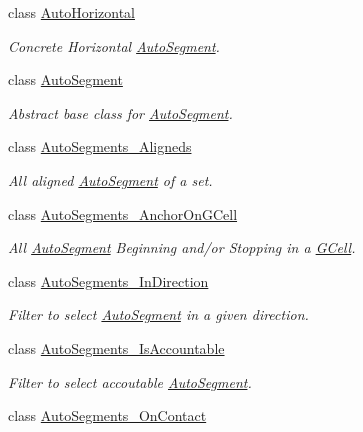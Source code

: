 \begin{DoxyCompactItemize}
class \mbox{\hyperlink{classKatabatic_1_1AutoHorizontal}{Auto\+Horizontal}}
\begin{DoxyCompactList}\small\item\em Concrete Horizontal \mbox{\hyperlink{classKatabatic_1_1AutoSegment}{Auto\+Segment}}. \end{DoxyCompactList}\item 
class \mbox{\hyperlink{classKatabatic_1_1AutoSegment}{Auto\+Segment}}
\begin{DoxyCompactList}\small\item\em Abstract base class for \mbox{\hyperlink{classKatabatic_1_1AutoSegment}{Auto\+Segment}}. \end{DoxyCompactList}\item 
class \mbox{\hyperlink{classKatabatic_1_1AutoSegments__Aligneds}{Auto\+Segments\+\_\+\+Aligneds}}
\begin{DoxyCompactList}\small\item\em All aligned \mbox{\hyperlink{classKatabatic_1_1AutoSegment}{Auto\+Segment}} of a set. \end{DoxyCompactList}\item 
class \mbox{\hyperlink{classKatabatic_1_1AutoSegments__AnchorOnGCell}{Auto\+Segments\+\_\+\+Anchor\+On\+G\+Cell}}
\begin{DoxyCompactList}\small\item\em All \mbox{\hyperlink{classKatabatic_1_1AutoSegment}{Auto\+Segment}} Beginning and/or Stopping in a \mbox{\hyperlink{classKatabatic_1_1GCell}{G\+Cell}}. \end{DoxyCompactList}\item 
class \mbox{\hyperlink{classKatabatic_1_1AutoSegments__InDirection}{Auto\+Segments\+\_\+\+In\+Direction}}
\begin{DoxyCompactList}\small\item\em Filter to select \mbox{\hyperlink{classKatabatic_1_1AutoSegment}{Auto\+Segment}} in a given direction. \end{DoxyCompactList}\item 
class \mbox{\hyperlink{classKatabatic_1_1AutoSegments__IsAccountable}{Auto\+Segments\+\_\+\+Is\+Accountable}}
\begin{DoxyCompactList}\small\item\em Filter to select accoutable \mbox{\hyperlink{classKatabatic_1_1AutoSegment}{Auto\+Segment}}. \end{DoxyCompactList}\item 
class \mbox{\hyperlink{classKatabatic_1_1AutoSegments__OnContact}{Auto\+Segments\+\_\+\+On\+Contact}}

\end{DoxyCompactItemize}
